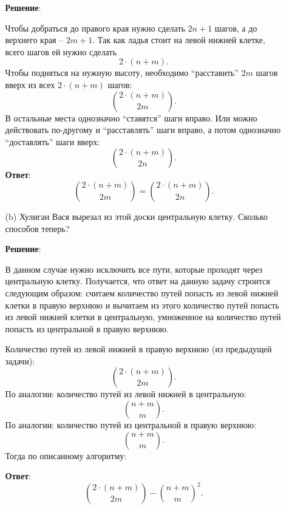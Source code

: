 \documentclass{article}
\begin{document}
\begin{enumerate}
\begin{itemize}
      \textbf{Решение}:

      Чтобы добраться до правого края нужно сделать $2n + 1$ шагов, а до верхнего края -- $2m + 1$. Так как ладья стоит на левой нижней клетке, всего шагов ей нужно сделать
      \begin{equation}
        2\cdot(n + m).
      \end{equation}
      Чтобы подняться на нужную высоту, необходимо ``расставить'' $2m$ шагов вверх из всех $2\cdot(n + m)$ шагов:
      \begin{equation}
        \binom{2\cdot(n + m)}{2m}.
      \end{equation}
      В остальные места однозначно ``ставятся'' шаги вправо. Или можно действовать по-другому и ``расставлять'' шаги вправо, а потом однозначно ``доставлять'' шаги вверх:
      \begin{equation}
        \binom{2\cdot(n + m)}{2n}.
      \end{equation}
      \textbf{Ответ}:
      $$\binom{2\cdot(n + m)}{2m} = \binom{2\cdot(n + m)}{2n}.$$

      \item[(b)] Хулиган Вася вырезал из этой доски центральную клетку. Сколько способов теперь?
      
      \textbf{Решение}:

      В данном случае нужно исключить все пути, которые проходят через центральную клетку. Получается, что ответ на данную задачу строится следующим образом: считаем количество путей попасть из левой нижней клетки в правую верхнюю и вычитаем из этого количество путей попасть из левой нижней клетки в центральную, умноженное на количество путей попасть из центральной в правую верхнюю.

      Количество путей из левой нижней в правую верхнюю (из предыдущей задачи):
      \begin{equation}
        \binom{2\cdot(n + m)}{2m}.
      \end{equation}
      По аналогии: количество путей из левой нижней в центральную:
      \begin{equation}
        \binom{n + m}{m}.
      \end{equation}
      По аналогии: количество путей из центральной в правую верхнюю:
      \begin{equation}
        \binom{n + m}{m}.
      \end{equation}
      Тогда по описанному алгоритму:

      \textbf{Ответ}:
      $$\binom{2\cdot(n + m)}{2m} - \binom{n + m}{m}^2.$$


\end{itemize}
\end{enumerate}
\end{document}
